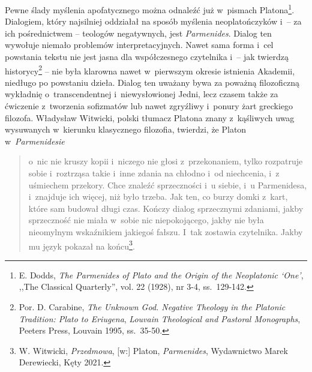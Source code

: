 Pewne ślady myślenia apofatycznego można odnaleźć już w~pismach Platona\footnote{E. Dodds, \textit{The Parmenides of Plato and the Origin of the Neoplatonic ‘One'}, ,,The Classical Quarterly'', vol. 22 (1928), nr 3-4, ss.~129-142.}. Dialogiem, który najsilniej oddziałał na sposób myślenia neoplatończyków i~-- za ich pośrednictwem -- teologów negatywnych, jest \textit{Parmenides}. Dialog ten wywołuje niemało problemów interpretacyjnych. Nawet sama forma i~cel powstania tekstu nie jest jasna dla współczesnego czytelnika i~-- jak twierdzą historycy\footnote{Por. D. Carabine, \textit{The Unknown God. Negative Theology in the Platonic Tradition: Plato to Eriugena}, \textit{Louvain Theological and Pastoral Monographs}, Peeters Press, Louvain 1995, ss.~35-50.} -- nie była klarowna nawet w~pierwszym okresie istnienia Akademii, niedługo po powstaniu dzieła. Dialog ten uważany bywa za poważną filozoficzną wykładnię o~transcendentnej i~niewysłowionej Jedni, lecz czasem także za ćwiczenie z~tworzenia sofizmatów lub nawet zgryźliwy i~ponury żart greckiego filozofa. Władysław Witwicki, polski tłumacz Platona znany z~kąśliwych uwag wysuwanych w~kierunku klasycznego filozofia, twierdzi, że Platon w~\textit{Parmenidesie}

\begin{quote}
o~nic nie kruszy kopii i~niczego nie głosi z~przekonaniem, tylko rozpatruje sobie i~roztrząsa takie i~inne zdania na chłodno i~od niechcenia, i~z uśmiechem przekory. Chce znaleźć sprzeczności i~u siebie, i~u Parmenidesa, i~znajduje ich więcej, niż było trzeba. Jak ten, co burzy domki z~kart, które sam budował długi czas. Kończy dialog sprzecznymi zdaniami, jakby sprzeczność nie miała w~sobie nic niepokojącego, jakby nie była nieomylnym wskaźnikiem jakiegoś fałszu. I~tak zostawia czytelnika. Jakby mu język pokazał na końcu\footnote{W. Witwicki, \textit{Przedmowa}, [w:] Platon, \textit{Parmenides}, Wydawnictwo Marek Derewiecki, Kęty 2021.}.
\end{quote}

